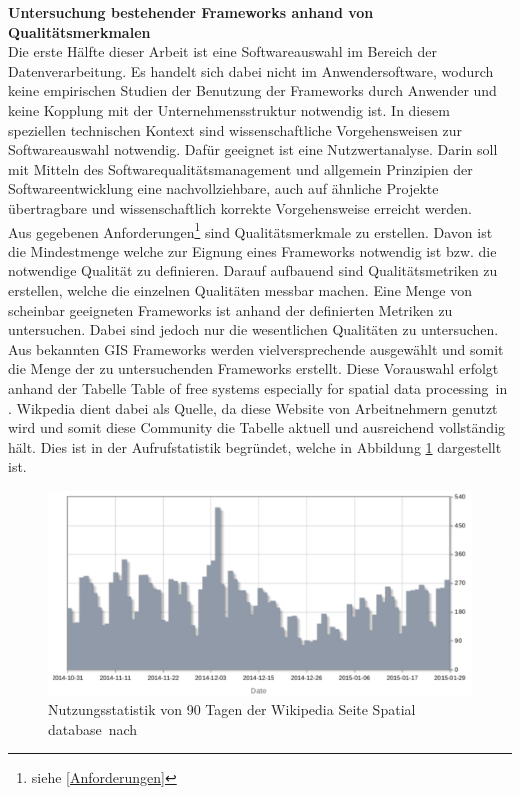 \textbf{Untersuchung bestehender Frameworks anhand von Qualitätsmerkmalen}\\
Die erste Hälfte dieser Arbeit ist eine Softwareauswahl im Bereich der Datenverarbeitung.
Es handelt sich dabei nicht im Anwendersoftware, wodurch keine empirischen Studien der Benutzung der Frameworks durch Anwender und keine Kopplung mit der Unternehmensstruktur notwendig ist.
In diesem speziellen technischen Kontext sind wissenschaftliche Vorgehensweisen zur Softwareauswahl notwendig.
Dafür geeignet ist eine Nutzwertanalyse. %
Darin soll mit Mitteln des Softwarequalitätsmanagement und allgemein Prinzipien der Softwareentwicklung eine nachvollziehbare, auch auf ähnliche Projekte übertragbare und wissenschaftlich korrekte Vorgehensweise erreicht werden.\\
Aus gegebenen Anforderungen\footnote{siehe \ref{Anforderungen}} sind Qualitätsmerkmale zu erstellen.
Davon ist die Mindestmenge welche zur Eignung eines Frameworks notwendig ist bzw. die notwendige  Qualität zu definieren.
Darauf aufbauend sind Qualitätsmetriken zu erstellen, welche die einzelnen Qualitäten messbar machen.
Eine Menge von scheinbar geeigneten Frameworks ist anhand der definierten Metriken zu untersuchen.
Dabei sind jedoch nur die wesentlichen Qualitäten zu untersuchen.
Aus bekannten GIS Frameworks werden vielversprechende ausgewählt und somit die Menge der zu untersuchenden Frameworks erstellt.
Diese Vorauswahl erfolgt anhand der Tabelle \glqq Table of free systems especially for spatial data processing\grqq\ in \cite{website:wiki-spatialdatabase}.
Wikpedia dient dabei als Quelle, da diese Website von Arbeitnehmern genutzt wird und somit diese Community die Tabelle aktuell und ausreichend vollständig hält.
Dies ist in der Aufrufstatistik begründet, welche in Abbildung \ref{fig:wiki-usage-spatialdatabase} dargestellt ist.
\begin{figure}
\centering
\includegraphics[width=\textwidth]{Abbildungen/wiki-spatialdatabase-usage.pdf}
\caption[Nutzungsstatistik der Wikipedia Seite spatial database]{Nutzungsstatistik von 90 Tagen der Wikipedia Seite \glqq Spatial database\grqq\ nach \cite{website:wiki-usage-spatialdatabase}}
\label{fig:wiki-usage-spatialdatabase}
\end{figure}
